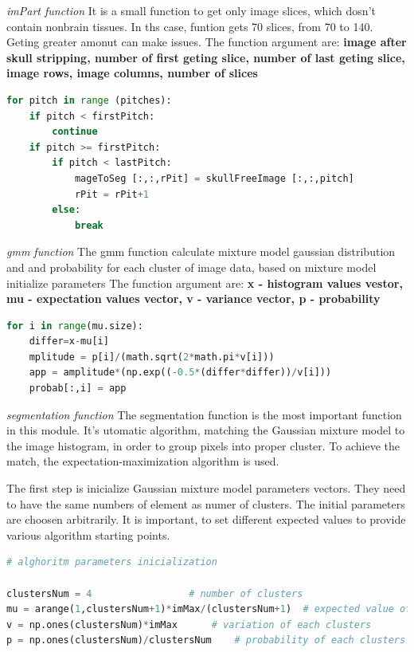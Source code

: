 \textit{imPart function}
It is a small function to get only image slices, which dosn't contain nonbrain tissues. In ths case, funtion gets 70 slices, from 70 to 140. Geting greater amonut can make issues. 
The function argument are: \textbf{image after skull stripping, number of first geting slice, number of last geting slice, image rows, image columns, number of slices}

\begin{lstlisting}[language=Python, caption = Geting part of image to segmentation]
for pitch in range (pitches):
    if pitch < firstPitch:
        continue
    if pitch >= firstPitch:
        if pitch < lastPitch:
            mageToSeg [:,:,rPit] = skullFreeImage [:,:,pitch]
            rPit = rPit+1
        else:
            break
\end{lstlisting}

\textit{gmm function}
The gmm function calculate mixture model gaussian distribution and and probability for each cluster of image data, based on mixture model initialize parameters
The function argument are: \textbf{x - histogram values vestor, mu - expectation values vector, v - variance vector, p - probability}

\begin{lstlisting}[language=Python, caption = gmm function]
for i in range(mu.size):
    differ=x-mu[i]
    mplitude = p[i]/(math.sqrt(2*math.pi*v[i]))
    app = amplitude*(np.exp((-0.5*(differ*differ))/v[i]))
    probab[:,i] = app	
\end{lstlisting}

\textit{segmentation function}
The segmentation function is the most important function in this module. It's utomatic algorithm, matching the Gaussian mixture model to the image histogram, in order to group pixels into proper cluster. To achieve the match, the expectation-maximization algorithm is used. 

The first step is inicialize Gaussian mixture model parameters vectors. They need to have the same numbers of element as numer of clusters. The initial parameters are choosen arbitrarily. It is important, to set different expected values to provide various algorithm starting points. 

\begin{lstlisting}[language=Python, caption = Segmentation -  parameters inicialization]
# alghoritm parameters inicialization 

clustersNum = 4					# number of clusters
mu = arange(1,clustersNum+1)*imMax/(clustersNum+1)	# expected value of each clusters
v = np.ones(clustersNum)*imMax		# variation of each clusters
p = np.ones(clustersNum)/clustersNum	# probability of each clusters
\end{lstlisting}

